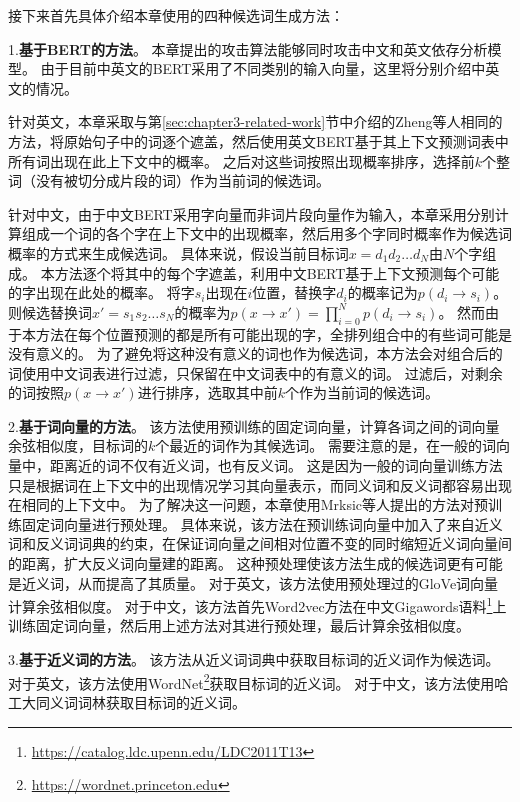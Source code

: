 接下来首先具体介绍本章使用的四种候选词生成方法：

1.\textbf{基于BERT的方法}\cite{zheng-etal-2020-evaluating}。
本章提出的攻击算法能够同时攻击中文和英文依存分析模型。
由于目前中英文的BERT采用了不同类别的输入向量，这里将分别介绍中英文的情况。

针对英文，本章采取与第\ref{sec:chapter3-related-work}节中介绍的Zheng等人相同的方法，将原始句子中的词逐个遮盖，然后使用英文BERT基于其上下文预测词表中所有词出现在此上下文中的概率。
之后对这些词按照出现概率排序，选择前$k$个整词（没有被切分成片段的词）作为当前词的候选词。

针对中文，由于中文BERT采用字向量而非词片段向量作为输入，本章采用分别计算组成一个词的各个字在上下文中的出现概率，然后用多个字同时概率作为候选词概率的方式来生成候选词。
具体来说，假设当前目标词$x=d_1d_2\dots d_N$由$N$个字组成。
本方法逐个将其中的每个字遮盖，利用中文BERT基于上下文预测每个可能的字出现在此处的概率。
将字$s_i$出现在$i$位置，替换字$d_i$的概率记为$p(d_i\rightarrow s_i)$。
则候选替换词$x'=s_1s_2\dots s_N$的概率为$p(x\rightarrow x') = \prod_{i=0}^{N}p(d_i\rightarrow s_i)$。
然而由于本方法在每个位置预测的都是所有可能出现的字，全排列组合中的有些词可能是没有意义的。
为了避免将这种没有意义的词也作为候选词，本方法会对组合后的词使用中文词表进行过滤，只保留在中文词表中的有意义的词。
过滤后，对剩余的词按照$p(x\rightarrow x')$进行排序，选取其中前$k$个作为当前词的候选词。

2.\textbf{基于词向量的方法}\cite{alzantot-etal-2018-generating}。
该方法使用预训练的固定词向量，计算各词之间的词向量余弦相似度，目标词的$k$个最近的词作为其候选词。
需要注意的是，在一般的词向量中，距离近的词不仅有近义词，也有反义词。
这是因为一般的词向量训练方法只是根据词在上下文中的出现情况学习其向量表示，而同义词和反义词都容易出现在相同的上下文中。
为了解决这一问题，本章使用Mrksic等人\cite{mrksic-etal-2016-counter}提出的方法对预训练固定词向量进行预处理。
具体来说，该方法在预训练词向量中加入了来自近义词和反义词词典的约束，在保证词向量之间相对位置不变的同时缩短近义词向量间的距离，扩大反义词向量建的距离。
这种预处理使该方法生成的候选词更有可能是近义词，从而提高了其质量。
对于英文，该方法使用预处理过的GloVe词向量\cite{pennington-etal-2014-glove}计算余弦相似度。
对于中文，该方法首先Word2vec方法\cite{mikolov-etal-2013-distributed}在中文Gigawords语料\footnote{\url{https://catalog.ldc.upenn.edu/LDC2011T13}}上训练固定词向量，然后用上述方法对其进行预处理，最后计算余弦相似度。

3.\textbf{基于近义词的方法}\cite{ren-etal-2019-generating}。
该方法从近义词词典中获取目标词的近义词作为候选词。
对于英文，该方法使用WordNet\footnote{\url{https://wordnet.princeton.edu}}获取目标词的近义词。
对于中文，该方法使用哈工大同义词词林获取目标词的近义词。


